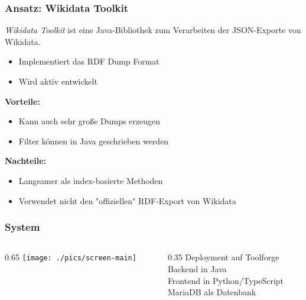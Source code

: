 \documentclass[aspectratio=169,xcolor=usenames,dvipsnames,svgnames]{beamer}
\begin{document}
\begin{frame}\frametitle{Ansatz: Wikidata Toolkit}
  \emph{Wikidata Toolkit} ist eine Java-Bibliothek zum Verarbeiten der JSON-Exporte von Wikidata.
  \begin{itemize}
      \item Implementiert das RDF Dump Format
      \item Wird aktiv entwickelt
  \end{itemize}

  \textbf{Vorteile:}
  \begin{itemize}
    \item Kann auch sehr große Dumps erzeugen
    \item Filter können in Java geschrieben werden

  \end{itemize}

  \textbf{Nachteile:}
  \begin{itemize}
      \item Langsamer als index-basierte Methoden
      \item Verwendet nicht den "offiziellen" RDF-Export von Wikidata
  \end{itemize}


\end{frame}

\begin{frame}\frametitle{System}
  \begin{figure}
    
  \end{figure}
\end{frame}

\begin{frame}
  \centering
  \begin{columns}
    \begin{column}{0.65\framewidth}
      \texttt{[image: ./pics/screen-main]}
    \end{column}
    \begin{column}{0.35\framewidth}
      Deployment auf Toolforge \\
      \vspace{0.5cm}
      Backend in Java \\
      \vspace{0.5cm}
      Frontend in Python/TypeScript \\
      \vspace{0.5cm}
      MariaDB als Datenbank \\
      \vspace{0.5cm}
      \hspace{-110pt}
    \end{column}
  \end{columns}
\end{frame}
\end{document}
